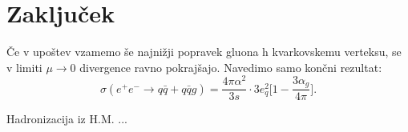 \documentclass[11pt]{article}
\begin{document}
\section{Zaključek}
Če v upoštev vzamemo še najnižji popravek gluona h kvarkovskemu verteksu, se v limiti $\mu \rightarrow 0$
divergence ravno pokrajšajo.
Navedimo samo končni rezultat:
\begin{equation}
       \sigma(e^+ e^-  \rightarrow q \bar{q} + q \bar{q} g) =
       \frac{4 \pi \alpha^2}{3s} \cdot 3 e_q^2
       \bigg [1 - \frac{3 \alpha_g}{4 \pi} \bigg ].
\end{equation}

Hadronizacija iz H.M. ...




\vspace{1cm}
\printbibliography
\end{document}
